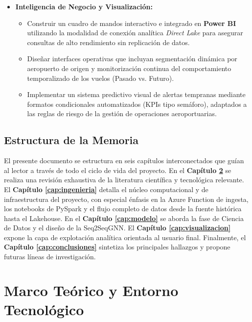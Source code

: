 \documentclass[12pt,oneside,a4paper]{report}
\renewcommand{\_}{\textunderscore\allowbreak}
\begin{document}
\begin{itemize}
    \item \textbf{Inteligencia de Negocio y Visualización:}
    \begin{itemize}
        \item Construir un cuadro de mandos interactivo e integrado en \textbf{Power BI} utilizando la modalidad de conexión analítica \textit{Direct Lake} para asegurar consultas de alto rendimiento sin replicación de datos.
        \item Diseñar interfaces operativas que incluyan segmentación dinámica por aeropuerto de origen y monitorización continua del comportamiento temporalizado de los vuelos (Pasado vs. Futuro).
        \item Implementar un sistema predictivo visual de alertas tempranas mediante formatos condicionales automatizados (KPIs tipo semáforo), adaptados a las reglas de riesgo de la gestión de operaciones aeroportuarias.
    \end{itemize}
\end{itemize}

\section{Estructura de la Memoria}
\label{sec:estructura}

El presente documento se estructura en seis capítulos interconectados que guían al lector a través de todo el ciclo de vida del proyecto. En el \textbf{Capítulo \ref{cap:marcoteorico}} se realiza una revisión exhaustiva de la literatura científica y tecnológica relevante. El \textbf{Capítulo \ref{cap:ingenieria}} detalla el núcleo computacional y de infraestructura del proyecto, con especial énfasis en la Azure Function de ingesta, los notebooks de PySpark y el flujo completo de datos desde la fuente histórica hasta el Lakehouse. En el \textbf{Capítulo \ref{cap:modelo}} se aborda la fase de Ciencia de Datos y el diseño de la Seq2SeqGNN. El \textbf{Capítulo \ref{cap:visualizacion}} expone la capa de explotación analítica orientada al usuario final. Finalmente, el \textbf{Capítulo \ref{cap:conclusiones}} sintetiza los principales hallazgos y propone futuras líneas de investigación.

\chapter{Marco Teórico y Entorno Tecnológico}
\label{cap:marcoteorico}
\end{document}
